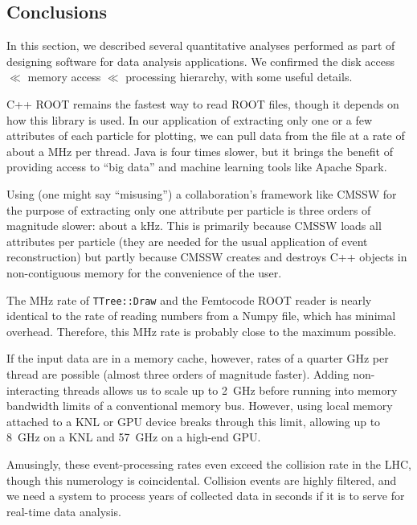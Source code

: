 \documentclass[12pt]{article}
\begin{document}
\subsection*{Conclusions}

In this section, we described several quantitative analyses performed as part of designing software for data analysis applications. We confirmed the disk access $\ll$ memory access $\ll$ processing hierarchy, with some useful details.

C++ ROOT remains the fastest way to read ROOT files, though it depends on how this library is used. In our application of extracting only one or a few attributes of each particle for plotting, we can pull data from the file at a rate of about a MHz per thread. Java is four times slower, but it brings the benefit of providing access to ``big data'' and machine learning tools like Apache Spark.

Using (one might say ``misusing'') a collaboration's framework like CMSSW for the purpose of extracting only one attribute per particle is three orders of magnitude slower: about a kHz. This is primarily because CMSSW loads all attributes per particle (they are needed for the usual application of event reconstruction) but partly because CMSSW creates and destroys C++ objects in non-contiguous memory for the convenience of the user.

The MHz rate of {\tt TTree::Draw} and the Femtocode ROOT reader is nearly identical to the rate of reading numbers from a Numpy file, which has minimal overhead. Therefore, this MHz rate is probably close to the maximum possible.

If the input data are in a memory cache, however, rates of a quarter GHz per thread are possible (almost three orders of magnitude faster). Adding non-interacting threads allows us to scale up to 2~GHz before running into memory bandwidth limits of a conventional memory bus. However, using local memory attached to a KNL or GPU device breaks through this limit, allowing up to 8~GHz on a KNL and 57~GHz on a high-end GPU.

Amusingly, these event-processing rates even exceed the collision rate in the LHC, though this numerology is coincidental. Collision events are highly filtered, and we need a system to process years of collected data in seconds if it is to serve for real-time data analysis.
\end{document}
